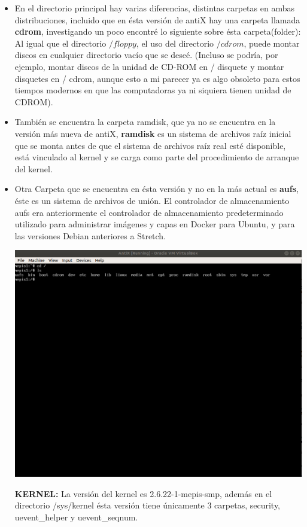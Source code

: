\documentclass[a4paper, 11pt, oneside]{article}
\begin{document}
\begin{itemize}
    \item En el directorio principal hay varias diferencias, distintas carpetas en ambas distribuciones, incluido que en ésta versión de antiX hay una carpeta llamada \textbf{cdrom}, investigando un poco encontré lo siguiente sobre ésta carpeta(folder): Al igual que el directorio 
    $/floppy$, el uso del directorio $/cdrom$, puede montar discos en cualquier directorio vacío que se deseé. (Incluso se podría, por ejemplo, montar discos de la unidad de CD-ROM en / disquete y montar disquetes en / cdrom, aunque esto a mi parecer ya es algo obsoleto para estos tiempos modernos en que las computadoras ya ni siquiera tienen unidad de CDROM).
    
    \item También se encuentra la carpeta ramdisk, que ya no se encuentra en la versión más nueva de antiX, \textbf{ramdisk} es un sistema de archivos raíz inicial que se monta antes de que el sistema de archivos raíz real esté disponible, está vinculado al kernel y se carga como parte del procedimiento de arranque del kernel. 
    
    \item Otra Carpeta que se encuentra en ésta versión y no en la más actual es \textbf{aufs}, éste es un sistema de archivos de unión. El controlador de almacenamiento aufs era anteriormente el controlador de almacenamiento predeterminado utilizado para administrar imágenes y capas en Docker para Ubuntu, y para las versiones Debian anteriores a Stretch.
    
    
    \begin{center}
        \includegraphics[scale=0.32]{antix3.png}
    \end{center}
    
     \textbf{KERNEL:} La versión del kernel es 2.6.22-1-mepis-smp, además en el directorio /sys/kernel
     ésta versión tiene únicamente 3 carpetas, security, uevent\_helper y uevent\_seqnum.
\end{itemize}
\end{document}
